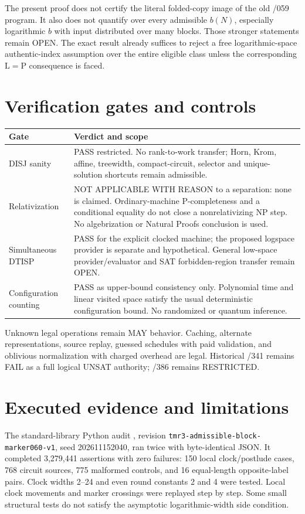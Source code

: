 \documentclass[11pt]{article}
\begin{document}
The present proof does not
certify the literal folded-copy image of the old /059 program. It also
does not quantify over every admissible $b(N)$, especially logarithmic
$b$ with input distributed over many blocks. Those stronger statements
remain OPEN. The exact result already suffices to reject a free
logarithmic-space authentic-index assumption over the entire eligible
class unless the corresponding $\mathrm L=\mathrm P$ consequence is faced.

\clearpage
\section{Verification gates and controls}
\begin{longtable}{p{}p{}}
\textbf{Gate} & \textbf{Verdict and scope}\\\hline
DISJ sanity & PASS restricted. No rank-to-work transfer; Horn, Krom,
affine, treewidth, compact-circuit, selector and unique-solution shortcuts
remain admissible.\\
Relativization & NOT APPLICABLE WITH REASON to a separation: none is
claimed. Ordinary-machine P-completeness and a conditional equality do
not close a nonrelativizing NP step. No algebrization or Natural Proofs
conclusion is used.\\
Simultaneous DTISP & PASS for the explicit clocked machine; the proposed
logspace provider is separate and hypothetical. General low-space
provider/evaluator and SAT forbidden-region transfer remain OPEN.\\
Configuration counting & PASS as upper-bound consistency only.
Polynomial time and linear visited space satisfy the usual deterministic
configuration bound. No randomized or quantum inference.\\
\end{longtable}
Unknown legal operations remain MAY behavior. Caching, alternate
representations, source replay, guessed schedules with paid validation,
and oblivious normalization with charged overhead are legal.
Historical /341 remains FAIL as a full logical UNSAT authority;
/386 remains RESTRICTED.

\section{Executed evidence and limitations}
The standard-library Python audit
, revision
\texttt{tmr3-admissible-block-marker060-v1}, seed 202611152040, ran twice
with byte-identical JSON. It completed 3,279,441 assertions with zero
failures: 150 local clock/postlude cases, 768 circuit sources, 775 malformed
controls, and 16 equal-length opposite-label pairs. Clock widths 2--24
and even round constants 2 and 4 were tested. Local clock movements and
marker crossings were replayed step by step. Some small structural tests
do not satisfy the asymptotic logarithmic-width side condition.
\end{document}

